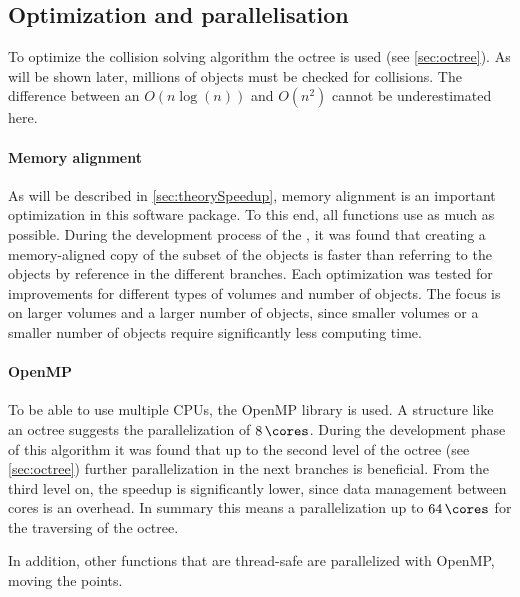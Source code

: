 \subsection{Optimization and parallelisation}\label{sec:modelOpt}
% 
To optimize the collision solving algorithm the octree is used (see \cref{sec:octree}).
As will be shown later, millions of objects must be checked for collisions.
The difference between an $O(n\log(n))$ and $O(n^2)$ cannot be underestimated here.
% 
%
\paragraph{Memory alignment}
As will be described in \cref{sec:theorySpeedup}, memory alignment is an important optimization in this software package.
To this end, all functions use  as much as possible.
During the development process of the , it was found that creating a memory-aligned copy of the subset of the objects is faster than referring to the objects by reference in the different branches.
Each optimization was tested for improvements for different types of volumes and number of objects.
The focus is on larger volumes and a larger number of objects, since smaller volumes or a smaller number of objects require significantly less computing time.
%
%
\paragraph{OpenMP}
To be able to use multiple \acp{CPU}, the \ac{OpenMP} library is used.
A structure like an octree suggests the parallelization of $\SI{8}{\cores}$.
During the development phase of this algorithm it was found that up to the second level of the octree (see \cref{sec:octree}) further parallelization in the next branches is beneficial.
From the third level on, the speedup is significantly lower, since data management between cores is an overhead.
In summary this means a parallelization up to $\SI{64}{\cores}$ for the traversing of the octree.
\par
% 
In addition, other functions that are thread-safe are parallelized with \ac{OpenMP}, \eg{} moving the points.
%
%
%
